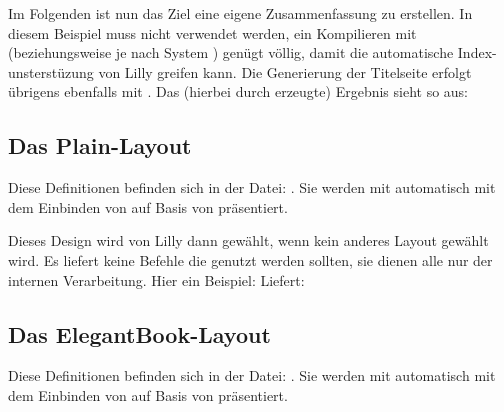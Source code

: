 %
%
%
%
%

\begin{bemerkung}
    Im Folgenden ist nun das Ziel eine eigene Zusammenfassung zu erstellen. In diesem Beispiel muss \Jake nicht verwendet werden, ein Kompilieren mit  (beziehungsweise je nach System ) genügt völlig, damit die automatische Index-unsterstüzung von Lilly greifen kann.
    Die Generierung der Titelseite erfolgt übrigens ebenfalls mit . Das (hierbei durch  erzeugte) Ergebnis sieht so aus:
    \begin{tcbraster}[raster columns=3, blankest, graphics pages={1,2,3}, colback=white]
    \end{tcbraster}
\end{bemerkung}

%
%
%
%
%

\subsection{Das Plain-Layout}
Diese Definitionen befinden sich in der Datei: . Sie werden mit  automatisch mit dem Einbinden von  auf Basis von  präsentiert. \medskip\newline

Dieses Design wird von Lilly dann gewählt, wenn kein anderes Layout gewählt wird. Es liefert keine Befehle die genutzt werden sollten, sie dienen alle nur der internen Verarbeitung. Hier ein Beispiel:
Liefert:
\begin{tcbraster}[raster columns=3, blankest,colback=white]
\end{tcbraster}

%
%
%
%
%

\subsection{Das ElegantBook-Layout}
Diese Definitionen befinden sich in der Datei: . Sie werden mit  automatisch mit dem Einbinden von  auf Basis von  präsentiert.

